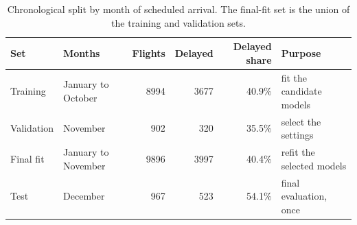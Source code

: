 \begin{table}[ht]
  \centering
  \caption{Chronological split by month of scheduled arrival. The final-fit set is the union of the training and validation sets.}
  \label{tab:split}
  \footnotesize
  \begin{tabular}{@{}llrrr>{\raggedright\arraybackslash}p{4.3cm}@{}}
    \toprule
    Set & Months & Flights & Delayed & Delayed share & Purpose \\
    \midrule
    Training & January to October & \num{8994} & \num{3677} & 40.9\% & fit the candidate models \\
    Validation & November & \num{902} & \num{320} & 35.5\% & select the settings \\
    Final fit & January to November & \num{9896} & \num{3997} & 40.4\% & refit the selected models \\
    Test & December & \num{967} & \num{523} & 54.1\% & final evaluation, once \\
    \bottomrule
  \end{tabular}
\end{table}
